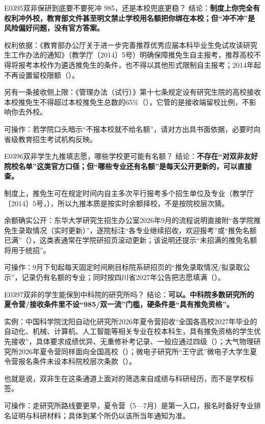 \begin{qa}{E0395}{双非保研到底要不要死冲 985，还是本校兜底更稳？}
结论：\textbf{制度上你完全有权利冲外校，教育部文件甚至明文禁止学校用名额把你绑在本校；但“冲不冲”是风险偏好问题，没有官方答案。}

权利依据：《教育部办公厅关于进一步完善推荐优秀应届本科毕业生免试攻读研究生工作办法的通知》（教学厅〔2014〕5号）明确保障推免生自主报考，推荐高校不得将报考本校作为遴选推免生的条件，也不得以其他形式限制自主报考；2014年起不再设置留校限额（）。

另有一条接收侧上限：《管理办法（试行）》第十七条规定设有研究生院的高校接收本校推免生不得超过本校推免生总数的65\%（），它管的是接收端留校比例，不影响你去外校。

可操作：若学院口头暗示“不报本校就不给名额”，请对方出具书面依据，必要时向省级教育招生考试机构反映。
\end{qa}

\begin{qa}{E0396}{双非学生九推填志愿，哪些学校更可能有名额？}
结论：\textbf{不存在“对双非友好院校名单”这类官方口径；但“哪些专业还有名额”是每天公开更新的，可以直接查。}

制度上，推免生可在规定时间内自主多次平行报考多个招生单位及专业（教学厅〔2014〕5号，），所以九推本质是按实时余额择校，不是按院校层次猜。

余额确实公开：东华大学研究生招生办公室2026年9月的流程说明直接附“各学院推免生录取情况（实时更新）”，逐院标注“各专业继续招收，欢迎报考”或“推免名额已满”（），这类表通常在学院研招页滚动更新；该说明还提示“未招满的推免名额将用于统招”。

可操作：9月下旬起每天固定时间刷目标院系研招页的“推免录取情况/拟录取公示”，记录仍有名额的专业；同时按四川省2027年公告把志愿填满（）。
\end{qa}

\begin{qa}{E0397}{双非的学生能保到中科院的研究所吗？}
结论：\textbf{可以。中科院多数研究所的夏令营/接收条件里不设“985/双一流”门槛，硬条件是“具有推免资格”。}

实例：中国科学院沈阳自动化研究所2026年夏令营招收“全国各高校2027年毕业的自动化、机械、计算机、人工智能等相关专业在校本科生，具有推免资格的学生优先接收”，具体要求成绩优异、无重修补考记录、一般应通过四级（）；大气物理研究所2026年夏令营同样面向全国高校（）；微电子研究所“王守武”微电子大学生夏令营报名条件未设本科院校层次条款（）。

也就是说，双非生在这条通道上面对的筛选来自成绩与科研经历，而不是学校标签。

可操作：走研究所路线要更早，夏令营（5—7月）是第一入口，报名时备好专业排名证明与科研材料；具体到某个所仍以该所当年通知为准。
\end{qa}

